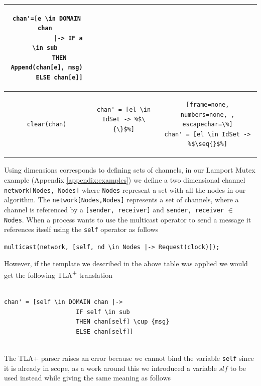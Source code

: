 \documentclass{thesul}
\newcommand{\tlaplus}{TLA\textsuperscript{+}\xspace}
\newcommand{\seq}[1]{\langle #1 \rangle}
\begin{document}
\begin{center}
\begin{tabular}{ | c | c | c | }
\begin{lstlisting}[frame=none, numbers=none]
chan'=[e \in DOMAIN chan 
			|-> IF a \in sub 
       THEN Append(chan[e], msg)
       ELSE chan[e]]

\end{lstlisting} \\ 
\hline

\begin{lstlisting}[frame=none, numbers=none]
clear(chan)
\end{lstlisting}
 & 
\begin{lstlisting}[frame=none, numbers=none, escapechar=\%]
chan' = [el \in IdSet -> %$\{\}$%]
					
\end{lstlisting} &

\begin{lstlisting}[frame=none, numbers=none, , escapechar=\%]
chan' = [el \in IdSet -> %$\seq{}$%]

\end{lstlisting} \\ 
\hline

\end{tabular}
\end{center}

Using dimensions corresponds to defining sets of channels, in our Lamport Mutex example (Appendix \ref{appendix:examples}) we define a two dimensional channel \verb|network[Nodes, Nodes]| where \verb|Nodes| represent a set with all the nodes in our algorithm. The \verb|network[Nodes,Nodes]| represents a set of channels, where a channel is referenced by a \verb|[sender, receiver]| and  \verb|sender, receiver| $\in$ \verb|Nodes|. When a process wants to use the multicast operator to send a message it references itself using the \verb|self| operator as follows  

\verb!multicast(network, [self, nd \in Nodes |-> Request(clock)]);! 

However, if the template we described in the above table was applied we would get the following \tlaplus translation

\begin{lstlisting}[frame=none, numbers=none]

chan' = [self \in DOMAIN chan |-> 
					IF self \in sub
					THEN chan[self] \cup {msg}
					ELSE chan[self]]
					
\end{lstlisting}

The TLA+ parser raises an error because we cannot bind the variable \verb|self| since it is already in scope, as a work around this we introduced a variable $slf$ to be used instead while giving the same meaning as follows
\end{document}
